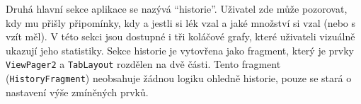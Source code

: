 \documentclass[../TakeYourPill.tex]{subfiles}
\begin{document}
Druhá hlavní sekce aplikace se nazývá \enquote{historie}. Uživatel zde může pozorovat, kdy mu přišly připomínky, kdy a jestli si lék vzal a jaké množství si vzal (nebo s vzít měl). V této sekci jsou dostupné i tři koláčové grafy, které uživateli vizuálně ukazují jeho statistiky. Sekce historie je vytovřena jako fragment, který je prvky \texttt{ViewPager2} a \texttt{TabLayout} rozdělen na dvě části. Tento fragment (\texttt{HistoryFragment}) neobsahuje žádnou logiku ohledně historie, pouze se stará o nastavení výše zmíněných prvků.

\end{document}
